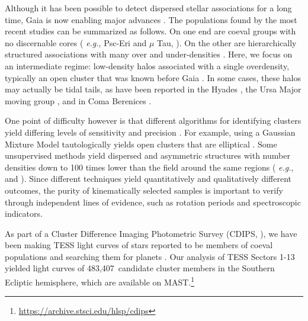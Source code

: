\documentclass[12pt,twocolumn,tighten]{aastex63}
\newcommand{\numsouthernuniqlcs}{483{,}407} %
\begin{document}
Although it has been possible to detect dispersed stellar associations
for a long time, Gaia is now enabling major advances \citep[{\it
e.g.},][]{de_zeeuw_hipparcos_1999,bergond_gravitational_2001,zuckerman_young_2004,oh_comoving_2017,cantatgaudin_gaia_2018,gagne_banyan_XII_2018,gagne_banyan_XIII_2018,kounkel_apogee2_2018,zari_3d_2018,kounkel_untangling_2019,furnkranz_comabernbhr_2019}.
The populations found by the most recent studies can be summarized as
follows.  On one end are coeval groups with no discernable cores ({\it
e.g.}, Psc-Eri and $\mu$ Tau,
\citealt{meingast_psceri_2019,curtis_tess_2019,gagne_mutau_2020}).  On
the other are hierarchically structured associations with many over
and under-densities  \citep[{\it e.g.} the Sco-Cen and Vela
associations,][]{pecaut_star_2016,cantatgaudin_velaOB2_2019}.  Here,
we focus on an intermediate regime: low-density halos associated with
a single overdensity, typically an open cluster that was known before
Gaia
\citep[see][]{kounkel_untangling_2019,kounkel_untanglingII_2020,meingast_2021}.
In some cases, these halos may actually be tidal tails, as have been
reported in the Hyades \citep{meingast_hyades_2019,roser_hyades_2019},
the Ursa Major moving group \citep{gagne_lowmassUMA_2020}, and in Coma
Berenices \citep{tang_comaber_2019,furnkranz_2019}. 

One point of difficulty however is that different algorithms for
identifying clusters yield differing levels of sensitivity and
precision \citep{hunt_clustering_2020}.  For example, using a Gaussian
Mixture Model tautologically yields open clusters that are elliptical
\citep[{\it e.g.},][]{wallace_m4_2018}.  Some unsupervised methods
yield dispersed and asymmetric structures with number densities down
to 100 times lower than the field around the same regions ({\it
e.g.}, \citealt{kounkel_untangling_2019} and \citealt{meingast_2021}).
Since different techniques yield quantitatively and
qualitatively different outcomes, the purity of kinematically selected
samples is important to verify through independent lines of evidence,
such as rotation periods and spectroscopic indicators.

As part of a Cluster Difference Imaging Photometric Survey (CDIPS,
\citealt{bouma_cdipsI_2019}), we have been making TESS light
curves of stars reported to be members of coeval populations and
searching them for planets \citep{bouma_cluster_2020}.  Our analysis
of TESS Sectors 1-13 yielded light curves of \numsouthernuniqlcs\
candidate cluster members in the Southern Ecliptic hemisphere, which
are available on
MAST.\footnote{\url{https://archive.stsci.edu/hlsp/cdips}}
\end{document}
